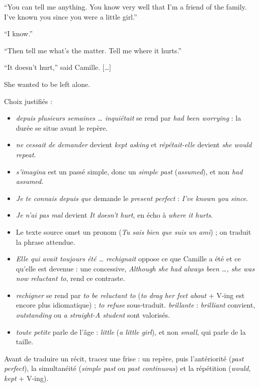 \documentclass[11pt,a4paper]{article}
\providecommand{\tightlist}{\setlength{\itemsep}{0pt}\setlength{\parskip}{0pt}}
\begin{document}
``You can tell me anything. You know very well that I'm a friend of the family. I've known you since you were a little girl.''

``I know.''

``Then tell me what's the matter. Tell me where it hurts.''

``It doesn't hurt,'' said Camille. {[}\ldots{]}

She wanted to be left alone.

Choix justifiés :

\begin{itemize}
\tightlist
\item
  \emph{depuis plusieurs semaines \ldots{} inquiétait} se rend par \emph{had been worrying} : la durée se situe avant le repère.
\item
  \emph{ne cessait de demander} devient \emph{kept asking} et \emph{répétait-elle} devient \emph{she would repeat}.
\item
  \emph{s'imagina} est un passé simple, donc un \emph{simple past} (\emph{assumed}), et non \emph{had assumed}.
\item
  \emph{Je te connais depuis que} demande le \emph{present perfect} : \emph{I've known you since}.
\item
  \emph{Je n'ai pas mal} devient \emph{It doesn't hurt}, en écho à \emph{where it hurts}.
\item
  Le texte source omet un pronom (\emph{Tu sais bien que suis un ami}) ; on traduit la phrase attendue.
\item
  \emph{Elle qui avait toujours été \ldots{} rechignait} oppose ce que Camille a été et ce qu'elle est devenue : une concessive, \emph{Although she had always been \ldots, she was now reluctant to}, rend ce contraste.
\item
  \emph{rechigner} se rend par \emph{to be reluctant to} (\emph{to drag her feet about} + V-ing est encore plus idiomatique) ; \emph{to refuse} sous-traduit. \emph{brillante} : \emph{brilliant} convient, \emph{outstanding} ou \emph{a straight-A student} sont valorisés.
\item
  \emph{toute petite} parle de l'âge : \emph{little} (\emph{a little girl}), et non \emph{small}, qui parle de la taille.
\end{itemize}

\begin{methode}

Avant de traduire un récit, tracez une frise : un repère, puis l'antériorité (\emph{past perfect}), la simultanéité (\emph{simple past} ou \emph{past continuous}) et la répétition (\emph{would}, \emph{kept} + V-ing).

\end{methode}
\end{document}
